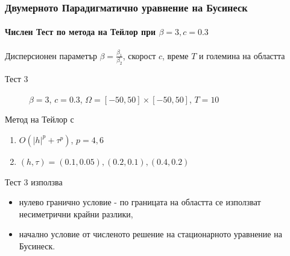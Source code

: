 \documentclass{beamer}
\begin{document}

\begin{frame}
\frametitle{Двумерното Парадигматично уравнение на Бусинеск}
\framesubtitle{Числен Тест по метода на Тейлор при $\beta = 3, c=0.3$}

Дисперсионен параметър $\beta= \frac{\beta_1}{\beta_2}$, скорост $c$, време $T$ и големина на областта
\begin{description}
 \item[Тест 3] $\beta = 3$, $c = 0.3$, $\Omega = [-50, 50] \times [-50, 50]$, $T = 10$
\end{description}

Метод на Тейлор с 
\begin{enumerate}
  \item $O(|h|^p + \tau^p)$, $p = 4, 6$
  \item $(h, \tau)=(0.1, 0.05), (0.2, 0.1), (0.4, 0.2)$
\end{enumerate}

Тест 3 използва 
\begin{itemize} 
\item нулево гранично условие - по границата на областта се използват несиметрични крайни разлики,
\item начално условие от численото решение на стационарното уравнение на Бусинеск.
\end{itemize}
\end{frame}
\end{document}
